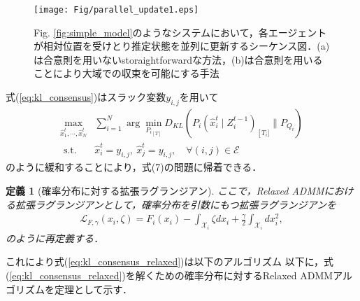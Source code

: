 \documentclass[a4paper,fleqn,10pt,twocolumn]{SICE_ISCS}
\newtheorem{definition}{定義}
\begin{document}
\begin{figure}[t]
	\begin{center}
		\texttt{[image: Fig/parallel\_update1.eps]}
		\caption{Fig. \ref{fig:simple_model}のようなシステムにおいて，各エージェントが相対位置を受けとり推定状態を並列に更新するシーケンス図．(a)は合意則を用いないstoraightforwardな方法，(b)は合意則を用いることにより大域での収束を可能にする手法}
		\label{fig:parallel_update}
	\end{center}
	\vspace{-2mm}
\end{figure}

式(\ref{eq:kl_consensus})はスラック変数$y_{i,j}$を用いて
\begin{equation}
\begin{aligned}
\max _{\hat x_{1}^{t}, \cdots, \hat x_{N}^{t}} & \sum_{i=1}^{N} \arg \min _{{P_{i}}_{[T]}} D_{K L}\left(P_{i}\left(\hat x_{i}^{t} \mid Z_{i}^{t-1}\right)_{\left[T_{i}]\right.} \| P_{Q_{i}} \right) \\
\text { s.t. } & \hat x_{i}^{t}=y_{i,j}, \:\hat x_{j}^{t}=y_{i,j}, \quad\forall(i, j) \in \mathcal{E}
\label{eq:kl_consensus_relaxed}
\end{aligned}
\end{equation}
のように緩和することにより，式(7)の問題に帰着できる．

\begin{definition}[確率分布に対する拡張ラグランジアン]
ここで，Relaxed ADMMにおける拡張ラグランジアンとして，確率分布を引数にもつ拡張ラグランジアンを
\begin{equation}
\begin{aligned}
 {\mathcal{ L}}_{F,\gamma}(x_i, \zeta) 
 = F_i(x_i) - \int_{{\mathcal{X}}_i}
\zeta dx_i + \frac{\gamma}{2}\int_{{\mathcal{X}}_i} dx_i^2,
\label{eq:relaxed_lagrangian}
\end{aligned}
\end{equation}
のように再定義する．
\end{definition}

これにより式(\ref{eq:kl_consensus_relaxed})は以下のアルゴリズム
以下に，式(\ref{eq:kl_consensus_relaxed})を解くための確率分布に対するRelaxed ADMMアルゴリズムを定理として示す．
\end{document}
